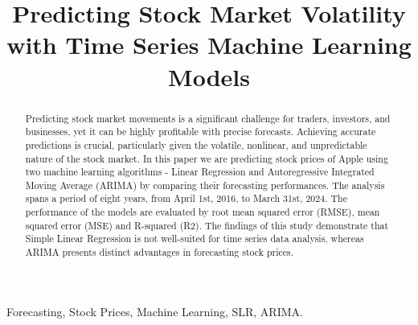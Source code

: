 \documentclass[conference,onecolumn,11pt]{IEEEtran}
\begin{document}
\title{Predicting Stock Market Volatility with Time Series Machine Learning Models\\
}

\author{
\and
{}
}

\maketitle

\begin{abstract}
Predicting stock market movements is a significant challenge for traders, investors, and businesses, yet it can be highly profitable with precise forecasts. Achieving accurate predictions is crucial, particularly given the volatile, nonlinear, and unpredictable nature of the stock market. In this paper we are predicting stock prices of Apple using two machine learning algorithms - Linear Regression and Autoregressive Integrated Moving Average (ARIMA) by comparing their forecasting performances. The analysis spans a period of eight years, from April 1st, 2016, to March 31st, 2024. The performance of the models are evaluated by root mean squared error (RMSE), mean squared error (MSE) and R-squared (R2). The findings of this study demonstrate that Simple Linear Regression is not well-suited for time series data analysis, whereas ARIMA presents distinct advantages in forecasting stock prices.

\end{abstract}

\begin{IEEEkeywords}
Forecasting, Stock Prices, Machine Learning, SLR, ARIMA. 
\end{IEEEkeywords}
\end{document}
